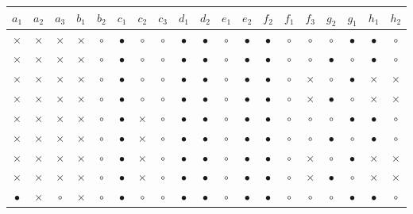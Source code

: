 \begin{BehExample}
\begin{table}
{\setlength\tabcolsep{3.25pt}
\noindent
\begin{tabular}{|c|c|c|c|c|c|c|c|c|c|c|c|c|c|c|c|c|c|c|}
  \hline
   $a_1$ & $a_2$ & $a_3$ & $b_1$ & $b_2$ & $c_1$ & $c_2$ & $c_3$ & $d_1$ & $d_2$ & $e_1$ & $e_2$ & $f_2$ & $f_1$ & $f_3$ & $g_2$ & $g_1$ & $h_1$ & $h_2$ \\ 
  \hline
  $\times$ & $\times$ & $\times$ & $\times$ & $\circ$ & $\bullet$ & $\circ$ & $\circ$ & $\bullet$ & $\bullet$ & $\circ$ & $\bullet$ & $\bullet$ & $\circ$ & $\circ$ & $\circ$ & $\bullet$ & $\bullet$ & $\circ$ \\ 
  \hline
  $\times$ & $\times$ & $\times$ & $\times$ & $\circ$ & $\bullet$ & $\circ$ & $\circ$ & $\bullet$ & $\bullet$ & $\circ$ & $\bullet$ & $\bullet$ & $\circ$ & $\circ$ & $\bullet$ & $\circ$ & $\bullet$ & $\circ$ \\ 
  \hline
  $\times$ & $\times$ & $\times$ & $\times$ & $\circ$ & $\bullet$ & $\circ$ & $\circ$ & $\bullet$ & $\bullet$ & $\circ$ & $\bullet$ & $\bullet$ & $\circ$ & $\times$ & $\circ$ & $\bullet$ & $\times$ & $\times$ \\ 
  \hline
  $\times$ & $\times$ & $\times$ & $\times$ & $\circ$ & $\bullet$ & $\circ$ & $\circ$ & $\bullet$ & $\bullet$ & $\circ$ & $\bullet$ & $\bullet$ & $\circ$ & $\times$ & $\bullet$ & $\circ$ & $\times$ & $\times$ \\ 
  \hline
  $\times$ & $\times$ & $\times$ & $\times$ & $\circ$ & $\bullet$ & $\times$ & $\circ$ & $\bullet$ & $\bullet$ & $\circ$ & $\bullet$ & $\bullet$ & $\circ$ & $\circ$ & $\circ$ & $\bullet$ & $\bullet$ & $\circ$ \\ 
  \hline
  $\times$ & $\times$ & $\times$ & $\times$ & $\circ$ & $\bullet$ & $\times$ & $\circ$ & $\bullet$ & $\bullet$ & $\circ$ & $\bullet$ & $\bullet$ & $\circ$ & $\circ$ & $\bullet$ & $\circ$ & $\bullet$ & $\circ$ \\ 
  \hline
  $\times$ & $\times$ & $\times$ & $\times$ & $\circ$ & $\bullet$ & $\times$ & $\circ$ & $\bullet$ & $\bullet$ & $\circ$ & $\bullet$ & $\bullet$ & $\circ$ & $\times$ & $\circ$ & $\bullet$ & $\times$ & $\times$ \\ 
  \hline
  $\times$ & $\times$ & $\times$ & $\times$ & $\circ$ & $\bullet$ & $\times$ & $\circ$ & $\bullet$ & $\bullet$ & $\circ$ & $\bullet$ & $\bullet$ & $\circ$ & $\times$ & $\bullet$ & $\circ$ & $\times$ & $\times$ \\ 
  \hline
  $\bullet$ & $\times$ & $\circ$ & $\times$ & $\circ$ & $\bullet$ & $\circ$ & $\circ$ & $\bullet$ & $\bullet$ & $\circ$ & $\bullet$ & $\bullet$ & $\circ$ & $\circ$ & $\circ$ & $\bullet$ & $\bullet$ & $\circ$ \\ 

\end{tabular}}
\end{table}
\end{BehExample}
